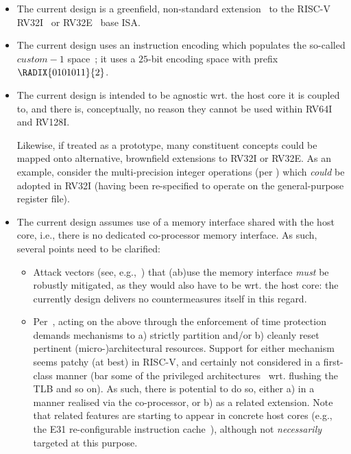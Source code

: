 \begin{itemize}

\item The current design is a 
      greenfield, non-standard extension~\cite[Section 21.1]{SCARV:RV:ISA:I:17} 
      to the RISC-V 
      RV32I~\cite[Section 2]{SCARV:RV:ISA:I:17}
      or
      RV32E~\cite[Section 3]{SCARV:RV:ISA:I:17}
      base 
      ISA.

\item The current design uses an instruction encoding which populates the
      so-called $custom-1$ space~\cite[Table 19.1]{SCARV:RV:ISA:I:17}; it
      uses a $25$-bit encoding space with prefix $\RADIX{0101011}{2}$.

\item The current design is intended to be agnostic wrt. the host core it
      is coupled to, and there is, conceptually, no reason they cannot be 
      used within RV64I and RV128I.

      Likewise, if treated as a prototype, many constituent concepts could
      be mapped onto alternative, brownfield extensions to RV32I or RV32E.
      As an example, consider the multi-precision integer operations 
      (per )
      which {\em could} be adopted in RV32I (having been re-specified to
      operate on the general-purpose register file).

\item The current design assumes use of a memory interface shared with the
      host core, i.e., there is no dedicated co-processor memory interface.
      As such, several points need to be clarified:

      \begin{itemize}
      \item Attack vectors (see, e.g.,~\cite{SCARV:GYCH:18}) that (ab)use 
            the memory interface {\em must} be robustly mitigated, as they
            would also have to be wrt. the host core: the currently design 
            delivers no countermeasures itself in this regard.
      \item Per~\cite{SCARV:GeYarHei:18}, acting on the above through the
            enforcement of time protection demands mechanisms to
            a) strictly partition
               and/or 
            b) cleanly reset
            pertinent (micro-)architectural resources.
            Support for either mechanism seems patchy (at best) in RISC-V,
            and certainly not considered in a first-class manner (bar some
            of the privileged architectures~\cite{SCARV:RV:ISA:II:17} wrt.
            flushing the TLB and so on).  As such, there is potential to 
            do so, either
            a) in a manner realised via the co-processor,
               or
            b) as a related extension.
            Note that related features are starting to appear in concrete 
            host cores
            (e.g., the E31 re-configurable instruction cache~\cite[Section 3.1.1]{SCARV:SiFive:E31}),
            although not {\em necessarily} targeted at this purpose.
      \end{itemize}


\end{itemize}
